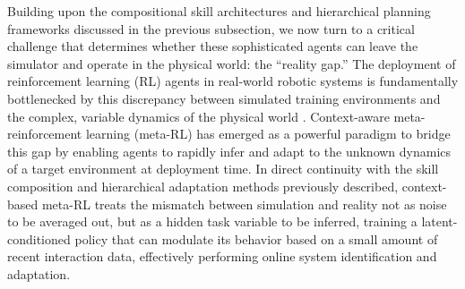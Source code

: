 \documentclass[11pt]{article}
\begin{document}
Building upon the compositional skill architectures and hierarchical planning frameworks discussed in the previous subsection, we now turn to a critical challenge that determines whether these sophisticated agents can leave the simulator and operate in the physical world: the ``reality gap.'' The deployment of reinforcement learning (RL) agents in real-world robotic systems is fundamentally bottlenecked by this discrepancy between simulated training environments and the complex, variable dynamics of the physical world \cite{ref397}. Context-aware meta-reinforcement learning (meta-RL) has emerged as a powerful paradigm to bridge this gap by enabling agents to rapidly infer and adapt to the unknown dynamics of a target environment at deployment time. In direct continuity with the skill composition and hierarchical adaptation methods previously described, context-based meta-RL treats the mismatch between simulation and reality not as noise to be averaged out, but as a hidden task variable to be inferred, training a latent-conditioned policy that can modulate its behavior based on a small amount of recent interaction data, effectively performing online system identification and adaptation.
\end{document}
